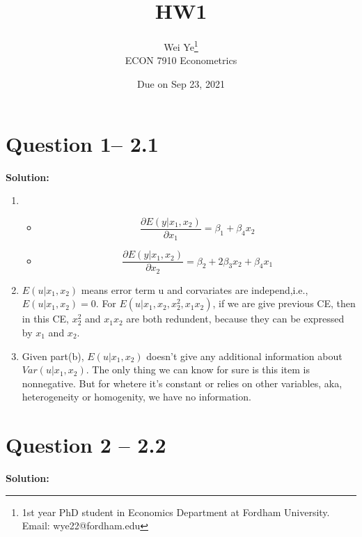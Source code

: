 \documentclass[11pt]{article} %
\title{HW1}
\author{Wei Ye\footnote{ 1st year PhD student in Economics Department at Fordham University. Email: wye22@fordham.edu}
    \\ ECON 7910 Econometrics}
\date{Due on Sep 23, 2021}
\begin{document}
	\maketitle

\section{Question 1-- 2.1}
\textbf{Solution:}

\begin{enumerate}
    \item    \begin{itemize}
        \item \begin{equation*}
            \frac{\partial E(y|x_1,x_2)}{\partial x_1}=\beta_1+\beta_4 x_2
        \end{equation*}
        \item \begin{equation*}
            \frac{\partial E(y|x_1,x_2)}{\partial x_2}=\beta_2+2\beta_3x_2+\beta_4x_1
        \end{equation*}
    \end{itemize}
    \item $E(u|x_1,x_2)$ means error term u and corvariates are independ,i.e., $E(u|x_1,x_2)=0$. For $E(u|x_1,x_2,x_2^2,x_1x_2)$, if 
            we are give previous CE, then in this CE, $x_2^2$ and $x_1x_2$ are both redundent, because they can be expressed by $x_1$ and $x_2$. 
    \item Given part(b), $E(u|x_1,x_2)$ doesn't give any additional information about $Var(u|x_1,x_2)$. The only thing we can know for sure is this item is nonnegative. But for whetere it's constant or relies on other variables, aka, heterogeneity or homogenity, we have no information.
\end{enumerate}

\section{Question 2 -- 2.2 }
\textbf{Solution:}
\end{document}
